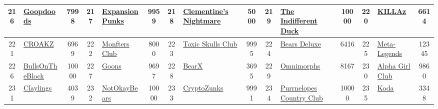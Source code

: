 \begin{table*}[]
{\begin{tabular}{|c|l|c|c|l|c|c|l|c|c|l|c|c|l|c|}
        216   & \href{http://goopdoods.io}{Goopdoods}                                              & 7998              & 217   & \href{https://expansionpunks.com/}{ExpansionPunks}                                                & 9959              & 218   & \href{https://clementinesnightmare.io}{Clementine's Nightmare}                    & 5000              & 219   & \href{https://theindifferentduck.com}{The Indifferent Duck}                   & 10000             & 220   & \href{https://playkillaz.io/}{KILLAz}                                                     & 6614                                    \\ \hline
        221   & \href{https://croakz.io}{CROAKZ}                                                   & 6969              & 222   & \href{https://www.monfter.com/}{Monfters Club}                                                    & 8000              & 223   & \href{https://opensea.io/collection/slokh}{Toxic Skulls Club}                     & 9995              & 224   & \href{https://bearsdeluxe.io}{Bears Deluxe}                                   & 6416              & 225   & \href{https://www.meta-legends.com/}{Meta-Legends}                                        & 12345                                   \\ \hline
        226   & \href{http://bullsontheblock.com}{BullsOnTheBlock}                                 & 10000             & 227   & \href{https://goonsofbalatroon.com/?utm\_source=GOBOpensea}{Goons}                                & 9697              & 228   & \href{https://bearxlabs.com/}{BearX}                                              & 3695              & 229   & \href{https://omnimorphs.com/}{Omnimorphs}                                    & 8167              & 230   & \href{http://alphagirlclub.io}{Alpha Girl Club}                                           & 9860                                    \\ \hline
        231   & \href{http://alphagirlclub.io}{Claylings}                                          & 4039              & 232   & \href{https://opensea.io/collection/not-okay-bears}{NotOkayBears}                                 & 10000             & 233   & \href{https://zunkz.com/}{CryptoZunks}                                            & 9991              & 234   & \href{https://www.purrnelopescountryclub.com/}{Purrnelopes Country Club}      & 10000             & 235   & \href{https://otherside.xyz}{Koda}                                                        & 3348                                    \\ \hline

\end{tabular}}
\end{table*}
